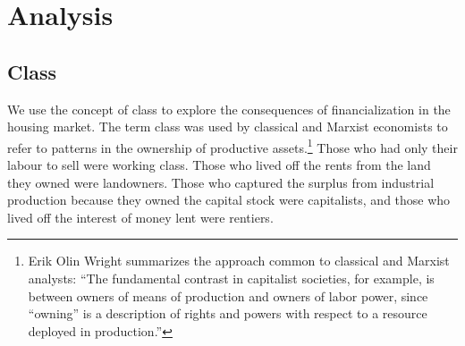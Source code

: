 \chapter{Analysis} \label{chapter-analysis}

\section{Class}
We use the concept of \gls{class}  to explore the consequences  of financialization in the housing market. The term class was  used  by classical and Marxist economists to refer to patterns in the ownership of productive assets.\footnote{ Erik Olin Wright summarizes the approach common to classical and Marxist analysts:  ``The fundamental contrast in capitalist societies, for example, is between owners of means of production and owners of labor power, since ``owning'' is a description of rights and powers with respect to a resource deployed in production.''\cite{wrightAlternativeFoundationsClass2002}} Those who had only their labour to sell were \gls{working class}. Those who lived off the rents from the land they owned were \glspl{landowner}. Those who captured the surplus from industrial production because they owned the capital stock were capitalists, and those who lived off the interest of money lent were \glspl{rentier}. 

